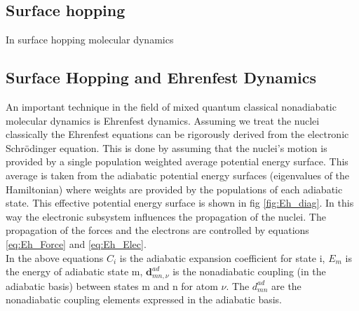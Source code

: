 \subsection{Surface hopping}
In surface hopping molecular dynamics
\clearpage

\subsection{Surface Hopping and Ehrenfest Dynamics \label{sec:Ehren_SH}}
An important technique in the field of mixed quantum classical nonadiabatic molecular dynamics is Ehrenfest dynamics. Assuming we treat the nuclei classically the Ehrenfest equations can be rigorously derived from the electronic Schr\"odinger equation. This is done by assuming that the nuclei's motion is provided by a single population weighted average potential energy surface. This average is taken from the adiabatic potential energy surfaces (eigenvalues of the Hamiltonian) where weights are provided by the populations of each adiabatic state. This effective potential energy surface is shown in fig \ref{fig:Eh_diag}. In this way the electronic subsystem influences the propagation of the nuclei. The propagation of the forces and the electrons are controlled by equations \eqref{eq:Eh_Force} and \eqref{eq:Eh_Elec}.
\\
In the above equations $C_{i}$ is the adiabatic expansion coefficient for state i, $E_{m}$ is the energy of adiabatic state m, $\mathbf{d}_{mn, \nu}^{ad}$ is the nonadiabatic coupling (in the adiabatic basis) between states m and n for atom $\nu$. The $d_{mn}^{ad}$ are the nonadiabatic coupling elements expressed in the adiabatic basis.

